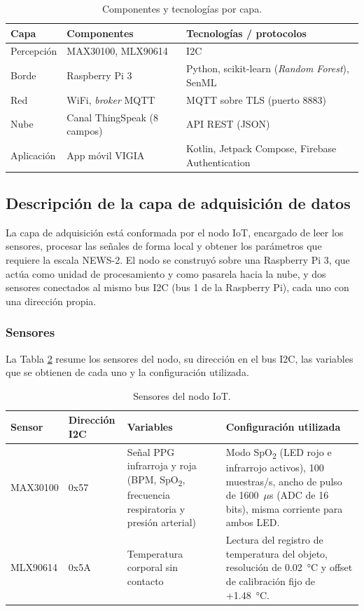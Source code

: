 \documentclass[11pt,a4paper]{article}
\begin{document}
\begin{table}[H]
\centering
\small
\begin{tabular}{>{\raggedright}p{2.6cm} >{\raggedright}p{5.2cm} p{6cm}}
\toprule
\textbf{Capa} & \textbf{Componentes} & \textbf{Tecnologías / protocolos} \\
\midrule
Percepción & MAX30100, MLX90614 & I2C \\
Borde & Raspberry Pi 3 & Python, scikit-learn (\textit{Random Forest}), SenML \\
Red & WiFi, \textit{broker} MQTT & MQTT sobre TLS (puerto 8883) \\
Nube & Canal ThingSpeak (8 campos) & API REST (JSON) \\
Aplicación & App móvil VIGIA & Kotlin, Jetpack Compose, Firebase Authentication \\
\bottomrule
\end{tabular}
\caption{Componentes y tecnologías por capa.}
\label{tab:capas}
\end{table}



\subsection{Descripción de la capa de adquisición de datos}

La capa de adquisición está conformada por el nodo IoT, encargado de leer los sensores, procesar las señales de forma local y obtener los parámetros que requiere la escala NEWS-2. El nodo se construyó sobre una Raspberry Pi 3, que actúa como unidad de procesamiento y como pasarela hacia la nube, y dos sensores conectados al mismo bus I2C (bus 1 de la Raspberry Pi), cada uno con una dirección propia.

\subsubsection{Sensores}

La Tabla \ref{tab:sensores} resume los sensores del nodo, su dirección en el bus I2C, las variables que se obtienen de cada uno y la configuración utilizada.

\begin{table}[H]
\centering
\small
\begin{tabular}{>{\raggedright}p{2.2cm} >{\raggedright}p{1.6cm} >{\raggedright}p{3.6cm} p{6.2cm}}
\toprule
\textbf{Sensor} & \textbf{Dirección I2C} & \textbf{Variables} & \textbf{Configuración utilizada} \\
\midrule
MAX30100 & 0x57 & Señal PPG infrarroja y roja (BPM, SpO\textsubscript{2}, frecuencia respiratoria y presión arterial) & Modo SpO\textsubscript{2} (LED rojo e infrarrojo activos), 100 muestras/s, ancho de pulso de 1600~$\mu$s (ADC de 16 bits), misma corriente para ambos LED. \\
MLX90614 & 0x5A & Temperatura corporal sin contacto & Lectura del registro de temperatura del objeto, resolución de 0.02~°C y offset de calibración fijo de +1.48~°C. \\
\bottomrule
\end{tabular}
\caption{Sensores del nodo IoT.}
\label{tab:sensores}
\end{table}
\end{document}
